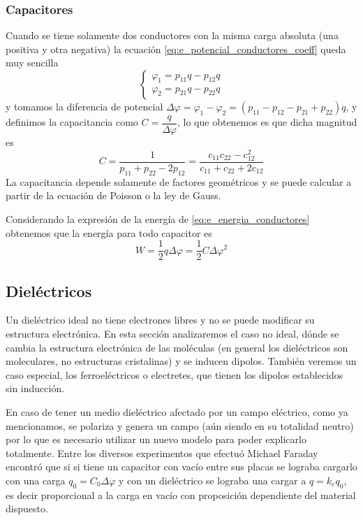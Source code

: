 \documentclass[11pt,a4paper]{article}
\numberwithin{equation}{section}
\begin{document}
\subsubsection{Capacitores}
Cuando se tiene solamente dos conductores con la misma carga absoluta (una positiva y otra negativa) la ecuación \ref{eq:e_potencial_conductores_coeff} queda muy sencilla
\begin{equation}
    \left\{ \begin{array}{l} \varphi_1 = p_{11} q - p_{12} q \\ \varphi_2 = p_{21} q - p_{22} q \end{array}\right.
\end{equation}
y tomamos la diferencia de potencial $\Delta \varphi = \varphi_1 - \varphi_2 = (p_{11} - p_{12} - p_{21} + p_{22})q$, y definimos la capacitancia como $C = \dfrac{q}{\Delta \varphi}$, lo que obtenemos es que dicha magnitud es
\begin{equation}
    C = \frac{1}{p_{11} + p_{22} - 2 p_{12}} = \frac{c_{11} c_{22} - c_{12}^2}{c_{11} + c_{22} + 2 c_{12}}
    \label{eq:e_capacitancia}
\end{equation}
La capacitancia depende solamente de factores geométricos y se puede calcular a partir de la ecuación de Poisson o la ley de Gauss. 

Considerando la expresión de la energía de \ref{eq:e_energia_conductores} obtenemos que la energía para todo capacitor es
\begin{equation}
    W = \frac{1}{2} q \Delta \varphi = \frac{1}{2} C \Delta \varphi^2                
    \label{eq:eng_capacitor}
\end{equation}
\subsection{Dieléctricos}
Un dieléctrico ideal no tiene electrones libres y no se puede modificar su estructura electrónica. En esta sección analizaremos el caso no ideal, dónde se cambia la estructura electrónica de las moléculas (en general los dieléctricos son moleculares, no estructuras cristalinas) y se inducen dipolos. También veremos un caso especial, los ferroeléctricos o electretes, que tienen los dipolos establecidos sin inducción.

En caso de tener un medio dieléctrico afectado por un campo eléctrico, como ya mencionamos, se polariza y genera un campo (aún siendo en su totalidad neutro) por lo que es necesario utilizar un nuevo modelo para poder explicarlo totalmente. Entre los diversos experimentos que efectuó Michael Faraday encontró que si si tiene un capacitor con vacío entre sus placas se lograba cargarlo con una carga $q_0 = C_0 \Delta \varphi$ y con un dieléctrico se lograba una cargar a $q = k_e q_0$, es decir proporcional a la carga en vacío con proposición dependiente del material dispuesto.
\end{document}
